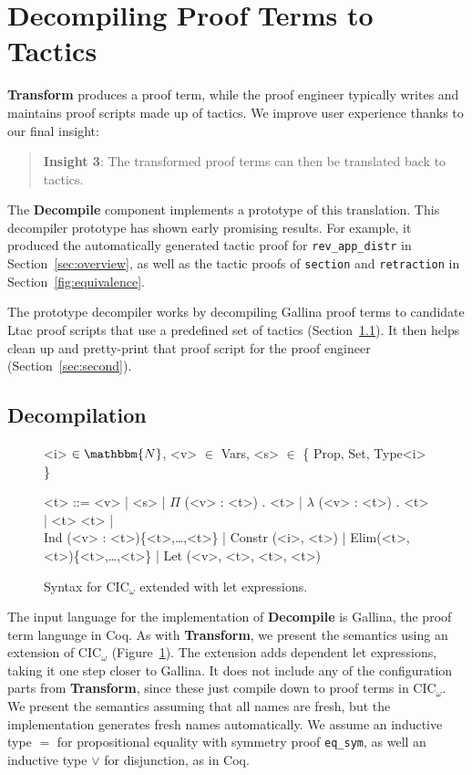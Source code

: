 \section{Decompiling Proof Terms to Tactics}
\label{sec:decompiler}

\textbf{Transform} produces a proof term,
while the proof engineer typically writes and maintains proof scripts made up of tactics.
We improve user experience thanks to our final insight:

\begin{quote}
\textbf{Insight 3}: The transformed proof terms can then be translated back to tactics.
\end{quote}

The \textbf{Decompile} component implements a prototype of this translation.
This decompiler prototype has shown early promising results.
For example, it produced the automatically generated tactic proof for \lstinline{rev_app_distr} 
in Section~\ref{sec:overview}, as well as the tactic proofs of \lstinline{section}
and \lstinline{retraction} in Section~\ref{fig:equivalence}.

The prototype decompiler works by decompiling Gallina proof terms to candidate Ltac proof scripts that 
use a predefined set of tactics (Section~\ref{sec:first}).
It then helps clean up and pretty-print that proof script for the proof engineer (Section~\ref{sec:second}).

\subsection{Decompilation}
\label{sec:first}

\begin{figure}
\small
\begin{grammar}
<i> $\in \mathbbm{N}$, <v> $\in$ Vars, <s> $\in$ \{ Prop, Set, Type<i> \}

<t> ::= <v> | <s> | $\Pi$ (<v> : <t>) . <t> | $\lambda$ (<v> : <t>) . <t> | <t> <t> | \\
Ind (<v> : <t>)\{<t>,\ldots,<t>\} | Constr (<i>, <t>) | Elim(<t>, <t>)\{<t>,\ldots,<t>\} | Let (<v>, <t>, <t>, <t>)
\end{grammar}
\caption{Syntax for CIC$_{\omega}$ extended with let expressions.}
\label{fig:gallinasyntax}
\end{figure}

The input language for the implementation of \textbf{Decompile} is Gallina, the proof term language in Coq.
As with \textbf{Transform}, we present the semantics using an extension of CIC$_{\omega}$ (Figure~\ref{fig:gallinasyntax}).
The extension adds dependent let expressions, taking it one step closer to Gallina.
It does not include any of the configuration parts from \textbf{Transform}, since these just compile down to proof terms in CIC$_{\omega}$.
We present the semantics assuming that all names are fresh, but the implementation generates fresh names automatically.
We assume an inductive type $=$ for propositional equality with symmetry proof \lstinline{eq_sym},
as well an inductive type $\vee$ for disjunction, as in Coq.


